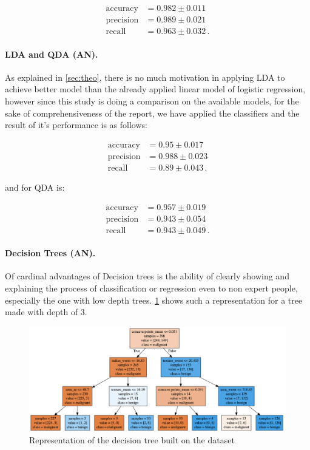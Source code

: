 \documentclass[12pt, a4paper]{scrartcl}
\begin{document}
\begin{align*}
	\text{accuracy} &= 0.982 \pm 0.011 \\
	\text{precision} &= 0.989 \pm 0.021 \\
	\text{recall} &= 0.963 \pm 0.032 \, .
\end{align*}




\paragraph{LDA and QDA (AN).} As explained in \cref{sec:theo}, there is no much motivation in applying LDA to achieve better model than the already applied linear model of logistic regression, however since this study is doing a comparison on the available models, for the sake of comprehensiveness of the report, we have applied the classifiers and the result of it's performance is as follows:

\begin{align*}
	\text{accuracy} &= 0.95 \pm 0.017\\
	\text{precision} &= 0.988 \pm 0.023 \\
	\text{recall} &= 0.89\pm 0.043 \, .
\end{align*}

and for QDA is:

\begin{align*}
	\text{accuracy} &= 0.957 \pm 0.019 \\
	\text{precision} &= 0.943 \pm 0.054 \\
	\text{recall} &= 0.943 \pm 0.049 \, .
\end{align*}


\paragraph{Decision Trees (AN).} Of cardinal advantages of Decision trees is the ability of clearly showing and explaining the process of classification or regression even to non expert people, especially the one with low depth trees. \cref{fig:graphviz} shows such a representation for a tree made with depth of 3. 

\begin{figure}[h]
	\centering
	\includegraphics[width=\textwidth]{graphviz}
	\caption{Representation of the decision tree built on the dataset}
	\label{fig:graphviz}
\end{figure}
\end{document}
